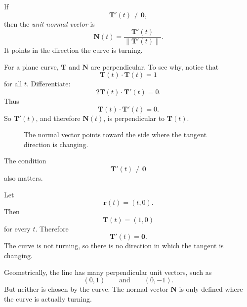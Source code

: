 \begin{definition}
If
\[
    \mathbf T'(t)\ne\mathbf 0,
\]
then the \emph{unit normal vector} is
\[
\boxed{
    \mathbf N(t)=\frac{\mathbf T'(t)}{\|\mathbf T'(t)\|}.
}
\]
It points in the direction the curve is turning.
\end{definition}

For a plane curve, \(\mathbf T\) and \(\mathbf N\) are perpendicular.  To see why,
notice that
\[
    \mathbf T(t)\cdot\mathbf T(t)=1
\]
for all \(t\).  Differentiate:
\[
    2\mathbf T(t)\cdot\mathbf T'(t)=0.
\]
Thus
\[
    \mathbf T(t)\cdot\mathbf T'(t)=0.
\]
So \(\mathbf T'(t)\), and therefore \(\mathbf N(t)\), is perpendicular to
\(\mathbf T(t)\).

\begin{figure}[h]
\centering
{}
\caption{The normal vector points toward the side where the tangent direction is changing.}
\end{figure}

The condition
\[
    \mathbf T'(t)\ne\mathbf 0
\]
also matters.

\begin{example}
Let
\[
    \mathbf r(t)=(t,0).
\]
Then
\[
    \mathbf T(t)=(1,0)
\]
for every \(t\).  Therefore
\[
    \mathbf T'(t)=\mathbf 0.
\]
The curve is not turning, so there is no direction in which the tangent is changing.

Geometrically, the line has many perpendicular unit vectors, such as
\[
    (0,1)
    \qquad\text{and}\qquad
    (0,-1).
\]
But neither is chosen by the curve.  The normal vector \(\mathbf N\) is only defined
where the curve is actually turning.
\end{example}

